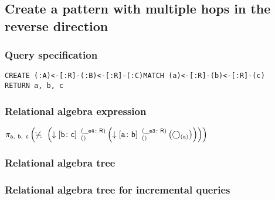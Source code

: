 \subsection{Create a pattern with multiple hops in the reverse direction}

\subsubsection*{Query specification}

\begin{lstlisting}
CREATE (:A)<-[:R]-(:B)<-[:R]-(:C)MATCH (a)<-[:R]-(b)<-[:R]-(c)
RETURN a, b, c
\end{lstlisting}

\subsubsection*{Relational algebra expression}

$\projection{\var{a},~\var{b},~\var{c}} \left(\alldifferent{} \left(\expandin{b}{c}{}{\_e4}{R} \left(\expandin{a}{b}{}{\_e3}{R} \left(\getvertices{a}{}\right)\right)\right)\right)$

\subsubsection*{Relational algebra tree}


\subsubsection*{Relational algebra tree for incremental queries}


